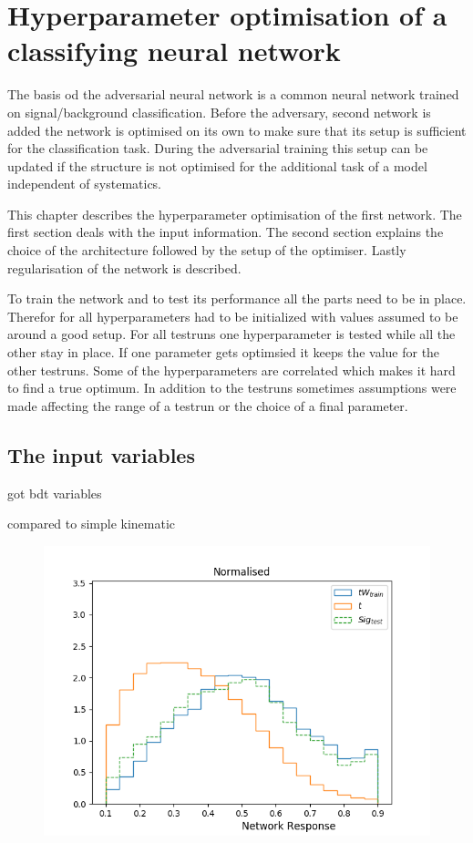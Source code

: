 \chapter{Hyperparameter optimisation of a classifying neural network}
\label{chp:simpleNN}

The basis od the adversarial neural network is a common neural network trained on signal/background classification.
Before the adversary, second network is added the network is optimised on its own to make sure that its setup is sufficient for the classification task.
During the adversarial training this setup can be updated if the structure is not optimised for the additional task of a model independent of systematics.

This chapter describes the hyperparameter optimisation of the first network. The first section deals with the input information.
The second section explains the choice of the architecture followed by the setup of the optimiser.
Lastly regularisation of the network is described.

To train the network and to test its performance all the parts need to be in place. Therefor for all hyperparameters had to be initialized with values assumed to be around a good setup. For all testruns one hyperparameter is tested while all the other stay in place. If one parameter gets optimsied it keeps the value for the other testruns. Some of the hyperparameters are correlated which makes it hard to find a true optimum. In addition to the testruns sometimes assumptions were made affecting the range of a testrun or the choice of a final parameter. 

\section{The input variables}

got bdt variables

compared to simple kinematic

\begin{figure}
	\centering
	\includegraphics[width=\figwidth]{figures_simpleNN/test_simple.png}
\end{figure}



